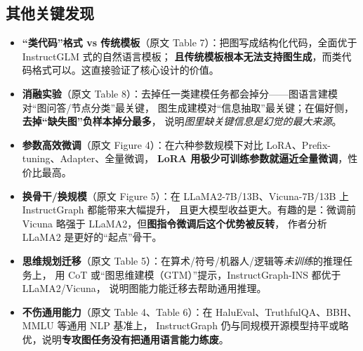 \documentclass[11pt,UTF8,fontset=fandol]{ctexart}
\begin{document}
\subsection{其他关键发现}
\begin{itemize}[leftmargin=2em]
  \item \textbf{“类代码”格式 vs 传统模板}（原文 Table 7）：把图写成结构化代码，全面优于 InstructGLM 式的自然语言模板；
        \textbf{且传统模板根本无法支持图生成}，而类代码格式可以。这直接验证了核心设计的价值。
  \item \textbf{消融实验}（原文 Table 8）：去掉任一类建模任务都会掉分——图语言建模对“图问答/节点分类”最关键，
        图生成建模对“信息抽取”最关键；在偏好侧，\textbf{去掉“缺失图”负样本掉分最多}，
        说明\emph{图里缺关键信息是幻觉的最大来源}。
  \item \textbf{参数高效微调}（原文 Figure 4）：在六种参数规模下对比 LoRA、Prefix-tuning、Adapter、全量微调，
        \textbf{LoRA 用极少可训练参数就逼近全量微调}，性价比最高。
  \item \textbf{换骨干/换规模}（原文 Figure 5）：在 LLaMA2-7B/13B、Vicuna-7B/13B 上 InstructGraph 都能带来大幅提升，
        且更大模型收益更大。有趣的是：微调前 Vicuna 略强于 LLaMA2，但\textbf{图指令微调后这个优势被反转}，
        作者分析 LLaMA2 是更好的“起点”骨干。
  \item \textbf{思维规划迁移}（原文 Table 5）：在算术/符号/机器人/逻辑等\emph{未训练}的推理任务上，
        用 CoT 或“图思维建模（GTM）”提示，InstructGraph-INS 都优于 LLaMA2/Vicuna，
        说明图能力能迁移去帮助通用推理。
  \item \textbf{不伤通用能力}（原文 Table 4、Table 6）：在 HaluEval、TruthfulQA、BBH、MMLU 等通用 NLP 基准上，
        InstructGraph 仍与同规模开源模型持平或略优，说明\textbf{专攻图任务没有把通用语言能力练废}。
\end{itemize}
\end{document}

